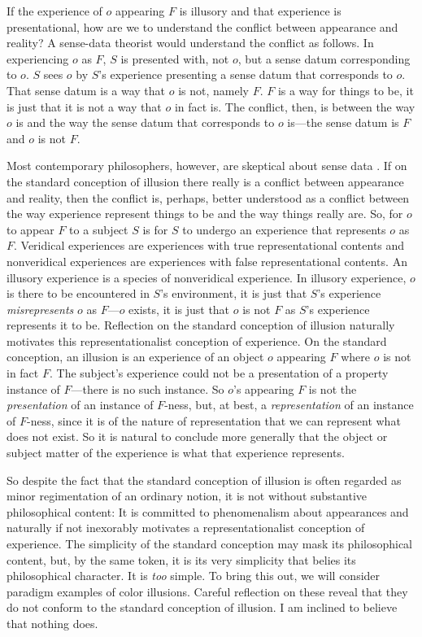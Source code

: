 \documentclass[12pt]{article}
\begin{document}
If the experience of \( o \) appearing \( F \) is illusory and that experience is presentational, how are we to understand the conflict between appearance and reality? A sense-data theorist would understand the conflict as follows. In experiencing \( o \) as \( F \), \( S \) is presented with, not \( o \), but a sense datum corresponding to \( o \). \( S \) sees \( o \) by \( S \)'s experience presenting a sense datum that corresponds to \( o \).  That sense datum is a way that \( o \) is not, namely \( F \). \( F \) is a way for things to be, it is just that it is not a way that \( o \) in fact is. The conflict, then, is between the way \( o \) is and the way the sense datum that corresponds to \( o \) is---the sense datum is \( F \) and \( o \) is not \( F \). 

Most contemporary philosophers, however, are skeptical about sense data \citep[though see][]{robinson94}. If on the standard conception of illusion there really is a conflict between appearance and reality, then the conflict is, perhaps, better understood as a conflict between the way experience represent things to be and the way things really are. So, for \( o \) to appear \( F \) to a subject \( S \) is for \( S \) to undergo an experience that represents \( o \) as \( F \). Veridical experiences are experiences with true representational contents and nonveridical experiences are experiences with false representational contents. An illusory experience is a species of nonveridical experience. In illusory experience, \( o \) is there to be encountered in \( S \)'s environment, it is just that \( S \)'s experience \emph{misrepresents} \( o \) as \( F \)---\( o \) exists, it is just that \( o \) is not \( F \) as \( S \)'s experience represents it to be. Reflection on the standard conception of illusion naturally motivates this representationalist conception of experience. On the standard conception, an illusion is an experience of an object \( o \) appearing \( F \) where \( o \) is not in fact \( F \). The subject's experience could not be a presentation of a property instance of \( F \)---there is no such instance. So \( o \)'s appearing \( F \) is not the \emph{presentation} of an instance of \( F \)-ness, but, at best, a \emph{representation} of an instance of \( F \)-ness, since it is of the nature of representation that we can represent what does not exist. So it is natural to conclude more generally that the object or subject matter of the experience is what that experience represents.

So despite the fact that the standard conception of illusion is often regarded as minor regimentation of an ordinary notion, it is not without substantive philosophical content: It is committed to phenomenalism about appearances and naturally if not inexorably motivates a representationalist conception of experience. The simplicity of the standard conception may mask its philosophical content, but, by the same token, it is its very simplicity that belies its philosophical character. It is \emph{too} simple. To bring this out, we will consider paradigm examples of color illusions. Careful reflection on these reveal that they do not conform to the standard conception of illusion. I am inclined to believe that nothing does.
\end{document}
